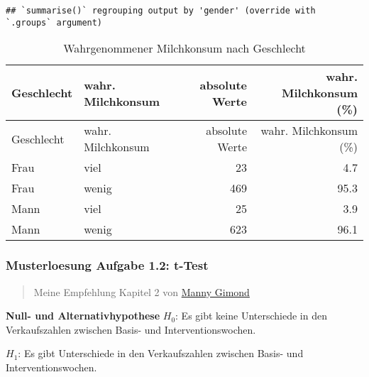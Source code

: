\documentclass[
]{article}
\newenvironment{Shaded}{\begin{snugshade}}{\end{snugshade}}
\newcommand{\CommentTok}[1]{\textcolor[rgb]{0.56,0.35,0.01}{\textit{#1}}}
\newcommand{\DataTypeTok}[1]{\textcolor[rgb]{0.13,0.29,0.53}{#1}}
\newcommand{\KeywordTok}[1]{\textcolor[rgb]{0.13,0.29,0.53}{\textbf{#1}}}
\newcommand{\NormalTok}[1]{#1}
\newcommand{\OperatorTok}[1]{\textcolor[rgb]{0.81,0.36,0.00}{\textbf{#1}}}
\newcommand{\StringTok}[1]{\textcolor[rgb]{0.31,0.60,0.02}{#1}}
\begin{document}
\begin{verbatim}
## `summarise()` regrouping output by 'gender' (override with `.groups` argument)
\end{verbatim}

\begin{longtable}[]{@{}llrr@{}}
\caption{Wahrgenommener Milchkonsum nach Geschlecht}\tabularnewline
\toprule
Geschlecht & wahr. Milchkonsum & absolute Werte & wahr. Milchkonsum
(\%)\tabularnewline
\midrule
\endfirsthead
\toprule
Geschlecht & wahr. Milchkonsum & absolute Werte & wahr. Milchkonsum
(\%)\tabularnewline
\midrule
\endhead
Frau & viel & 23 & 4.7\tabularnewline
Frau & wenig & 469 & 95.3\tabularnewline
Mann & viel & 25 & 3.9\tabularnewline
Mann & wenig & 623 & 96.1\tabularnewline
\bottomrule
\end{longtable}

\hypertarget{musterloesung-aufgabe-1.2-t-test}{%
\subsubsection{Musterloesung Aufgabe 1.2:
t-Test}\label{musterloesung-aufgabe-1.2-t-test}}

\begin{quote}
Meine Empfehlung Kapitel 2 von
\href{https://mgimond.github.io/Stats-in-R/z_t_tests.html}{Manny Gimond}
\end{quote}

\textbf{Null- und Alternativhypothese} \(H_0\): Es gibt keine
Unterschiede in den Verkaufszahlen zwischen Basis- und
Interventionswochen.

\par

\(H_1\): Es gibt Unterschiede in den Verkaufszahlen zwischen Basis- und
Interventionswochen.

\begin{Shaded}
\end{Shaded}
\end{document}

